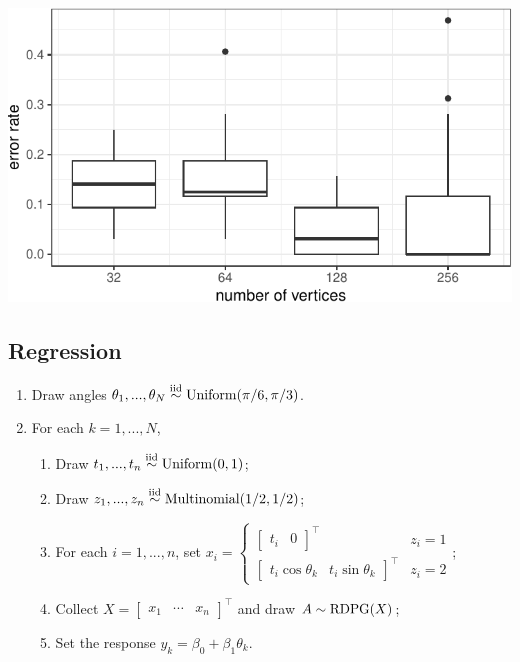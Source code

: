 \documentclass[
  11pt,
]{article}
\providecommand{\tightlist}{%
  \setlength{\itemsep}{0pt}\setlength{\parskip}{0pt}}
\begin{document}
\begin{center}\includegraphics{draft_files/figure-latex/classification-sim-1} \end{center}

\hypertarget{regression}{%
\subsection{Regression}\label{regression}}

\begin{enumerate}
\def\labelenumi{\arabic{enumi}.}
\tightlist
\item
  Draw angles
  \(\theta_1, ..., \theta_N \stackrel{\mathrm{iid}}{\sim} \mathrm{Uniform}(\pi / 6, \pi / 3)\).
\item
  For each \(k = 1, ..., N\),

  \begin{enumerate}
  \def\labelenumii{\roman{enumii}.}
  \tightlist
  \item
    Draw \(t_1, ..., t_n \stackrel{\mathrm{iid}}{\sim} \mathrm{Uniform}(0, 1)\);
  \item
    Draw \(z_1, ..., z_n \stackrel{\mathrm{iid}}{\sim} \mathrm{Multinomial}(1/2, 1/2)\);
  \item
    For each \(i = 1, ..., n\), set
    \(x_i = \begin{cases} \begin{bmatrix} t_i & 0 \end{bmatrix}^\top & z_i = 1 \\ \begin{bmatrix} t_i \cos \theta_k & t_i \sin \theta_k \end{bmatrix}^\top & z_i = 2 \end{cases}\);
  \item
    Collect
    \(X = \begin{bmatrix} x_1 & \cdots & x_n \end{bmatrix}^\top\) and
    draw \(A \sim \mathrm{RDPG}(X)\);
  \item
    Set the response \(y_k = \beta_0 + \beta_1 \theta_k\).
  \end{enumerate}
\end{enumerate}
\end{document}
